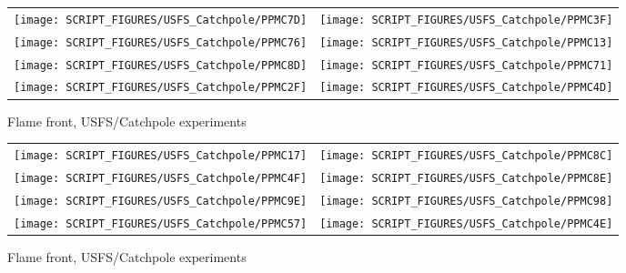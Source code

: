 \begin{figure}[p]
\begin{tabular*}{\textwidth}{l@{\extracolsep{\fill}}r}
\texttt{[image: SCRIPT\_FIGURES/USFS\_Catchpole/PPMC7D]} &
\texttt{[image: SCRIPT\_FIGURES/USFS\_Catchpole/PPMC3F]} \\
\texttt{[image: SCRIPT\_FIGURES/USFS\_Catchpole/PPMC76]} &
\texttt{[image: SCRIPT\_FIGURES/USFS\_Catchpole/PPMC13]} \\
\texttt{[image: SCRIPT\_FIGURES/USFS\_Catchpole/PPMC8D]} &
\texttt{[image: SCRIPT\_FIGURES/USFS\_Catchpole/PPMC71]} \\
\texttt{[image: SCRIPT\_FIGURES/USFS\_Catchpole/PPMC2F]} &
\texttt{[image: SCRIPT\_FIGURES/USFS\_Catchpole/PPMC4D]} \\
\end{tabular*}
\caption[Flame front, USFS/Catchpole experiments]{Flame front, USFS/Catchpole experiments}
\label{USFS_Catchpole_216}
\end{figure}

\FloatBarrier

\begin{figure}[p]
\begin{tabular*}{\textwidth}{l@{\extracolsep{\fill}}r}
\texttt{[image: SCRIPT\_FIGURES/USFS\_Catchpole/PPMC17]} &
\texttt{[image: SCRIPT\_FIGURES/USFS\_Catchpole/PPMC8C]} \\
\texttt{[image: SCRIPT\_FIGURES/USFS\_Catchpole/PPMC4F]} &
\texttt{[image: SCRIPT\_FIGURES/USFS\_Catchpole/PPMC8E]} \\
\texttt{[image: SCRIPT\_FIGURES/USFS\_Catchpole/PPMC9E]} &
\texttt{[image: SCRIPT\_FIGURES/USFS\_Catchpole/PPMC98]} \\
\texttt{[image: SCRIPT\_FIGURES/USFS\_Catchpole/PPMC57]} &
\texttt{[image: SCRIPT\_FIGURES/USFS\_Catchpole/PPMC4E]} \\
\end{tabular*}
\caption[Flame front, USFS/Catchpole experiments]{Flame front, USFS/Catchpole experiments}
\label{USFS_Catchpole_224}
\end{figure}

